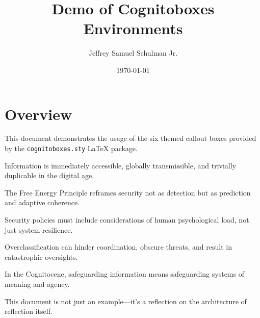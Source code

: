 \documentclass[12pt]{article}
\title{Demo of Cognitoboxes Environments}
\author{Jeffrey Samuel Schulman Jr.}
\date{\today}
\begin{document}
\maketitle

\section*{Overview}

This document demonstrates the usage of the six themed callout boxes provided by the \texttt{cognitoboxes.sty} LaTeX package.

\begin{infoshiftbox}
Information is immediately accessible, globally transmissible, and trivially duplicable in the digital age.
\end{infoshiftbox}

\begin{conceptbox}
The Free Energy Principle reframes security not as detection but as prediction and adaptive coherence.
\end{conceptbox}

\begin{ethicsbox}
Security policies must include considerations of human psychological load, not just system resilience.
\end{ethicsbox}

\begin{warningbox}
Overclassification can hinder coordination, obscure threats, and result in catastrophic oversights.
\end{warningbox}

\begin{futurebox}
In the Cognitocene, safeguarding information means safeguarding systems of meaning and agency.
\end{futurebox}

\begin{metabox}
This document is not just an example—it’s a reflection on the architecture of reflection itself.
\end{metabox}
\end{document}
